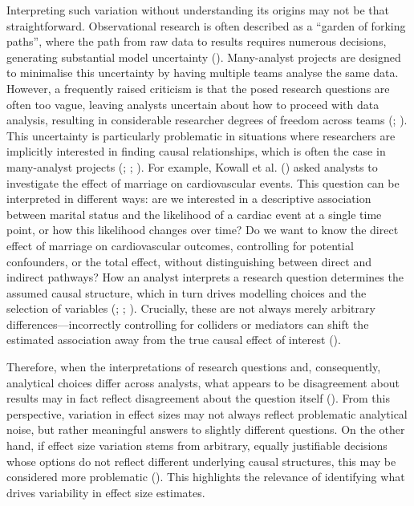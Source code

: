 \documentclass[
  man,
  floatsintext,
  longtable,
  nolmodern,
  notxfonts,
  notimes,
  colorlinks=true,linkcolor=blue,citecolor=blue,urlcolor=blue]{apa7}
\begin{document}
Interpreting such variation without understanding its origins may not be
that straightforward. Observational research is often described as a
``garden of forking paths'', where the path from raw data to results
requires numerous decisions, generating substantial model uncertainty
().
Many-analyst projects are designed to minimalise this uncertainty by
having multiple teams analyse the same data. However, a frequently
raised criticism is that the posed research questions are often too
vague, leaving analysts uncertain about how to proceed with data
analysis, resulting in considerable researcher degrees of freedom across
teams (;
). This
uncertainty is particularly problematic in situations where researchers
are implicitly interested in finding causal relationships, which is
often the case in many-analyst projects
(;
; ). For
example, Kowall et al. () asked
analysts to investigate the effect of marriage on cardiovascular events.
This question can be interpreted in different ways: are we interested in
a descriptive association between marital status and the likelihood of a
cardiac event at a single time point, or how this likelihood changes
over time? Do we want to know the direct effect of marriage on
cardiovascular outcomes, controlling for potential confounders, or the
total effect, without distinguishing between direct and indirect
pathways? How an analyst interprets a research question determines the
assumed causal structure, which in turn drives modelling choices and the
selection of variables (; ; ).
Crucially, these are not always merely arbitrary
differences---incorrectly controlling for colliders or mediators can
shift the estimated association away from the true causal effect of
interest ().

Therefore, when the interpretations of research questions and,
consequently, analytical choices differ across analysts, what appears to
be disagreement about results may in fact reflect disagreement about the
question itself (). From this perspective, variation in effect sizes may not
always reflect problematic analytical noise, but rather meaningful
answers to slightly different questions. On the other hand, if effect
size variation stems from arbitrary, equally justifiable decisions whose
options do not reflect different underlying causal structures, this may
be considered more problematic
(). This highlights the relevance of identifying what drives
variability in effect size estimates.
\end{document}
